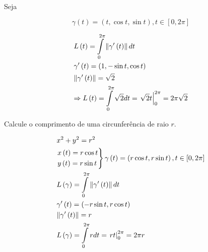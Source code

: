\documentclass[11pt, oneside, a4paper]{gsm-l}
\begin{document}
\begin{exem}
Seja

\[
    \gamma \left( t \right) = \left( {t,\cos t,\sin t} \right),t \in \left[ {0,2\pi } \right]
\]

\end{exem}

\begin{sol}
\[
\begin{gathered}
  L\left( t \right) = \int\limits_0^{2\pi } {\left\| {\gamma '\left( t \right)} \right\|dt}  \hfill \\
\gamma '\left( t \right) = \left( {1, - \sin t,\cos t} \right) \hfill \\
\left\| {\gamma '\left( t \right)} \right\| = \sqrt 2  \hfill \\
   \Rightarrow L\left( t \right) = \int\limits_0^{2\pi } {\sqrt 2 dt}  = \left. {\sqrt 2 t} \right|_0^{2\pi }  = 2\pi \sqrt 2  \hfill \\
\end{gathered}
\]

\end{sol}

\newpage 

\begin{exem}
Calcule o comprimento de uma circunfer\^encia de raio $r$.

\end{exem}

\begin{sol}
\[
\begin{gathered}
x^2  + y^2  = r^2  \hfill \\
\left. \begin{gathered}
x\left( t \right) = r\cos t \hfill \\
y\left( t \right) = r\sin t \hfill \\
\end{gathered}  \right\}\gamma \left( t \right) = \left( {r\cos t,r\sin t} \right),t \in \left[ {0,2\pi } \right] \hfill \\
  L\left( \gamma  \right) = \int\limits_0^{2\pi } {\left\| {\gamma '\left( t \right)} \right\|dt}  \hfill \\
\gamma '\left( t \right) = \left( { - r\sin t,r\cos t} \right) \hfill \\
\left\| {\gamma '\left( t \right)} \right\| = r \hfill \\
  L\left( \gamma  \right) = \int\limits_0^{2\pi } {rdt}  = \left. {rt} \right|_0^{2\pi }  = 2\pi r \hfill \\
\end{gathered}
\]

\end{sol}
\end{document}

